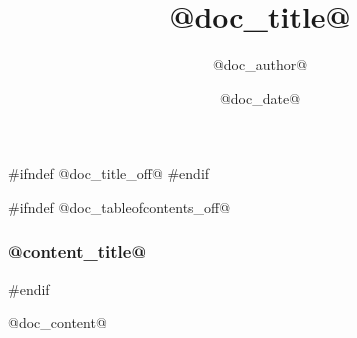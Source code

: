 \documentclass{beamer}
\title{@doc_title@}
\date{@doc_date@}
\author{@doc_author@}
\begin{document}
#ifndef @doc_title_off@
\frame[plain]{\titlepage}
#endif

#ifndef @doc_tableofcontents_off@
\begin{frame}
\frametitle{@content_title@}
\tableofcontents
\end{frame}
#endif

@doc_content@
\end{document}

